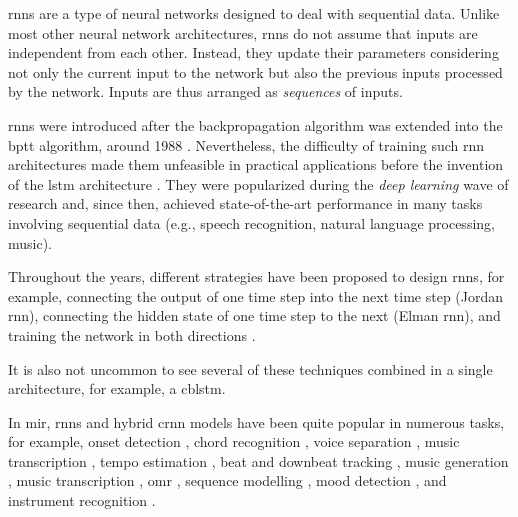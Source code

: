 

\glspl{rnn} are a type of neural networks designed to deal
with sequential data. Unlike most other neural network
architectures, \glspl{rnn} do not assume that inputs are
independent from each other. Instead, they update their
parameters considering not only the current input to the
network but also the previous inputs processed by the
network. Inputs are thus arranged as \emph{sequences} of
inputs.

\glspl{rnn} were introduced after the backpropagation
algorithm \parencite{rumelhart1988learning} was extended
into the \gls{bptt} algorithm, around 1988
\parencite{werbos1988generalization,
werbos1990backpropagation}. Nevertheless, the difficulty of
training such \gls{rnn} architectures made them unfeasible
in practical applications before the invention of the
\gls{lstm} architecture \parencite{hochreiter1997long}. They
were popularized during the \emph{deep learning} wave of
research and, since then, achieved state-of-the-art
performance in many tasks involving sequential data (e.g.,
speech recognition, natural language processing, music).

Throughout the years, different strategies have been
proposed to design \glspl{rnn}, for example, connecting the
output of one time step into the next time step (Jordan
\gls{rnn}), connecting the hidden state of one time step to
the next (Elman \gls{rnn}), and training the network in both
directions \parencite{schuster1997bidirectional}.

It is also not uncommon to see several of these techniques
combined in a single architecture, for example, a
\gls{cblstm}.

In \gls{mir}, \glspl{rnn} and hybrid \gls{crnn} models have
been quite popular in numerous tasks, for example, onset
detection \parencite{eyben2010universal}, chord recognition
\parencite{boulangerlewandowski2013audio, sigtia2016endend,
sears2018evaluating}, voice separation
\parencite{huang2014singingvoice}, music transcription
\parencite{sigtia2014rnnbased}, tempo estimation
\parencite{bock2015accurate}, beat and downbeat tracking
\parencite{bock2016joint, krebs2016downbeat}, music
generation \parencite{liu2016predicting, liang2017automatic,
lim2017chord}, music transcription
\parencite{rigaud2016singing, sigtia2016endend,
southall2016automatic, vogl2016recurrent,
southall2017automatic, vogl2017drum, basaran2018main},
\gls{omr} \parencite{calvozaragoza2017onestep,
wel2017optical, calvozaragoza2018cameraprimus}, sequence
modelling \parencite{ycart2017study}, mood detection
\parencite{delbouys2018music}, and instrument recognition
\parencite{gururani2018instrument}.



